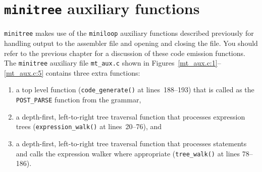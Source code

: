 \section{{\tt minitree} auxiliary functions}

{\tt minitree} makes use of the {\tt miniloop} auxiliary functions described previously 
for handling output to the assembler file and opening and closing the file. You should
refer to the previous chapter for a discussion of these code emission functions. 
The {\tt minitree} auxiliary file \verb|mt_aux.c| shown in Figures~\ref{mt_aux.c:1}--\ref{mt_aux.c:5}
contains three extra functions:
\begin{enumerate}
\item a top level function (\verb|code_generate()| at lines~188--193) that is called as the
\verb|POST_PARSE| function from the grammar,
\item a depth-first, left-to-right tree traversal function that processes expression trees
(\verb|expression_walk()| at lines~20--76), and
\item a depth-first, left-to-right tree traversal function that processes statements and
calls the expression walker where appropriate (\verb|tree_walk()| at lines 78--186).
\end{enumerate}

